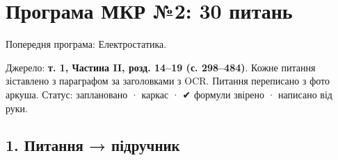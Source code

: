 \documentclass[11pt,a4paper,oneside]{book}
\newcommand{\ok}{{\sffamily\color{green!45!black}✔}}
\begin{document}
\chapter*{Програма МКР №2: 30 питань}


Попередня програма: Електростатика.

Джерело: \textbf{т. 1, Частина II, розд. 14–19 (с. 298–484)}. Кожне питання зіставлено з параграфом за заголовками з OCR. Питання переписано з фото аркуша.
Статус:  заплановано ·  каркас · \ok{} формули звірено ·  написано від руки.

\section*{1. Питання → підручник}
\end{document}
